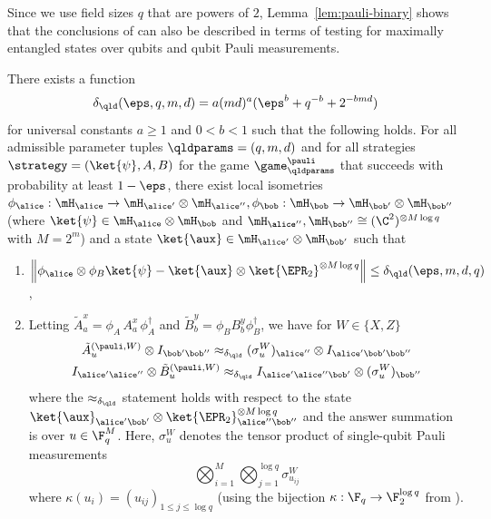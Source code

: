 Since we use field sizes $q$ that are powers of $2$, Lemma~\ref{lem:pauli-binary}
shows that the conclusions of  can also be described in terms of
testing for maximally entangled states over qubits and qubit Pauli measurements.







\begin{corollary}
\label{cor:pauli-binary}  
There exists a function
\[\delta_{\qld}(\eps,q,m,d) = a(md)^a(\eps^b + q^{-b} + 2^{-bmd})\]
for universal constants $a \geq 1$ and $0 < b < 1$ such that the following holds. For all admissible parameter tuples $\qldparams = (q,m,d)$ and for all strategies $\strategy = (\ket{\psi},A,B)$ for the game $\game^\pauli_\qldparams$ that succeeds with probability at least $1 - \eps$, there exist local isometries $\phi_\alice: \mH_\alice \to \mH_{\alice'} \otimes \mH_{\alice''},\phi_\bob: \mH_\bob \to \mH_{\bob'} \otimes \mH_{\bob''}$ (where $\ket{\psi} \in \mH_\alice \otimes \mH_\bob$ and $\mH_{\alice''},\mH_{\bob''} \cong (\C^2)^{\otimes M \log q}$ with $M = 2^m$) and a state $\ket{\aux} \in \mH_{\alice'} \otimes \mH_{\bob'}$ such that 
\begin{enumerate}
    \item $\left \| \phi_\alice \otimes \phi_B \ket{\psi} - \ket{\aux} \otimes \ket{\EPR_2}^{\otimes M \log q}  \right \| \leq \delta_{\qld}(\eps,m,d,q)$,
    \item Letting $\tilde{A}^x_a = \phi_A\, A^x_a \, \phi_A^\dagger$ and $\tilde{B}^y_b = \phi_B B^y_b \phi_B^\dagger$, we have for $W \in \{X,Z\}$
    \begin{gather*}
        \tilde{A}^{(\pauli,W)}_u \otimes I_{\bob'\bob''} \approx_{\delta_{\qld}} (\sigma^W_u)_{\alice''} \otimes I_{\alice' \bob' \bob''} \\
        I_{\alice'\alice''} \otimes \tilde{B}^{(\pauli,W)}_u    \approx_{\delta_{\qld}} I_{\alice' \alice'' \bob'} \otimes (\sigma^W_u)_{\bob''}
    \end{gather*}
    where the $\approx_{\delta_{\qld}}$ statement holds with respect to the state $\ket{\aux}_{\alice'\bob'} \otimes \ket{\EPR_2}^{\otimes M \log q}_{\alice''\bob''}$ and the answer summation is over $u \in \F_q^M$. Here, $\sigma^W_u$ denotes the tensor product of single-qubit Pauli measurements
    \[
    	\bigotimes_{i=1}^{M} \bigotimes_{j=1}^{\log q} \sigma^W_{u_{ij}}
    \]
    where $\kappa(u_i) = (u_{ij})_{1 \leq j \leq \log q}$ (using the bijection $\kappa: \F_q \to \F_2^{\log q}$ from ).
\end{enumerate}  
\end{corollary}

